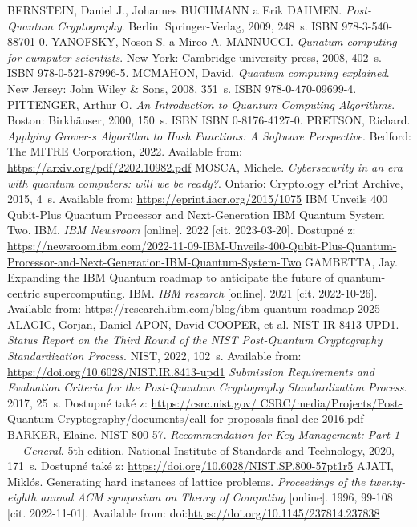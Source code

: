 \begin{thebibliography}{99}
  BERNSTEIN, Daniel J., Johannes BUCHMANN a Erik DAHMEN. \textit{Post-Quantum Cryptography}. Berlin: Springer-Verlag, 2009, 248~s. ISBN 978-3-540-88701-0.
  YANOFSKY, Noson S. a Mirco A. MANNUCCI. \textit{Qunatum computing for cumputer scientists}. New York: Cambridge university press, 2008, 402~s. ISBN 978-0-521-87996-5.
  MCMAHON, David. \textit{Quantum computing explained}. New Jersey: John Wiley \& Sons, 2008, 351~s. ISBN 978-0-470-09699-4.
  PITTENGER, Arthur O. \textit{An Introduction to Quantum Computing Algorithms}. Boston: Birkhäuser, 2000, 150~s. ISBN ISBN 0-8176-4127-0.
  PRETSON, Richard. \textit{Applying Grover-s Algorithm to Hash Functions: A Software Perspective}. Bedford: The MITRE Corporation, 2022. Available from: \url{https://arxiv.org/pdf/2202.10982.pdf}
  MOSCA, Michele. \textit{Cybersecurity in an era with quantum computers: will we be ready?}. Ontario: Cryptology ePrint Archive, 2015, 4~s. Available from: \url{https://eprint.iacr.org/2015/1075}
  IBM Unveils 400 Qubit-Plus Quantum Processor and Next-Generation IBM Quantum System Two. IBM. \textit{IBM Newsroom} [online]. 2022 [cit. 2023-03-20]. Dostupné z: \url{https://newsroom.ibm.com/2022-11-09-IBM-Unveils-400-Qubit-Plus-Quantum-Processor-and-Next-Generation-IBM-Quantum-System-Two}
  GAMBETTA, Jay. Expanding the IBM Quantum roadmap to anticipate the future of quantum-centric supercomputing. IBM. \textit{IBM research} [online]. 2021 [cit. 2022-10-26]. Available from: \url{https://research.ibm.com/blog/ibm-quantum-roadmap-2025}
  ALAGIC, Gorjan, Daniel APON, David COOPER, et al. NIST IR 8413-UPD1. \textit{Status Report on the Third Round of the NIST Post-Quantum Cryptography Standardization Process}. NIST, 2022, 102~s. Available from: \url{https://doi.org/10.6028/NIST.IR.8413-upd1}
  \textit{Submission Requirements and Evaluation Criteria for the Post-Quantum Cryptography Standardization Process}. 2017, 25~s. Dostupné také z: \url{https://csrc.nist.gov/ CSRC/media/Projects/Post-Quantum-Cryptography/documents/call-for-proposals-final-dec-2016.pdf}
  BARKER, Elaine. NIST 800-57. \textit{Recommendation for Key Management: Part 1 --- General}. 5th edition. National Institute of Standards and Technology, 2020, 171~s. Dostupné také z: \url{https://doi.org/10.6028/NIST.SP.800-57pt1r5}
  AJATI, Miklós. Generating hard instances of lattice problems. \textit{Proceedings of the twenty-eighth annual ACM symposium on Theory of Computing} [online]. 1996, 99-108 [cit. 2022-11-01]. Available from: doi:\url{https://doi.org/10.1145/237814.237838}

\end{thebibliography}

